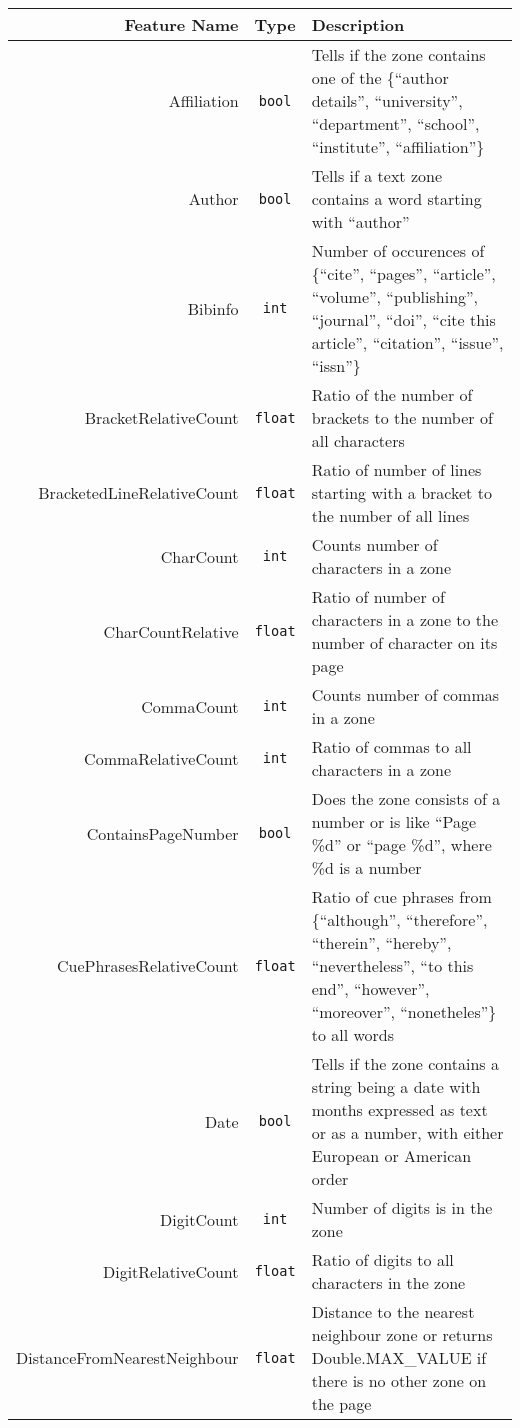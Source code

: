 \begin{appendices}
\small
\setlength\LTleft{-2cm}
\begin{longtable}[c]{|r|c|p{8cm}|}
\hline
\textbf{Feature Name} & \textbf{Type} & \textbf{Description} \\ \hline
Affiliation & \verb+bool+ & Tells if the zone contains one of the \{``author details'', ``university'', ``department'', ``school'', ``institute'', ``affiliation''\}\\ \hline
Author & \verb+bool+ & Tells if a text zone contains a word starting with ``author''\\ \hline
Bibinfo & \verb+int+ & Number of occurences of \{``cite'', ``pages'', ``article'', ``volume'', ``publishing'', ``journal'', ``doi'', ``cite this article'', ``citation'', ``issue'', ``issn''\} \\ \hline
BracketRelativeCount & \verb+float+ & Ratio of the number of brackets to the number of all characters \\ \hline
BracketedLineRelativeCount & \verb+float+ & Ratio of number of lines starting with a bracket to the number of all lines\\ \hline
CharCount & \verb+int+ & Counts number of characters in a zone\\ \hline
CharCountRelative & \verb+float+ & Ratio of number of characters in a zone to the number of character on its page\\ \hline
CommaCount & \verb+int+ & Counts number of commas in a zone\\ \hline
CommaRelativeCount & \verb+int+ & Ratio of commas to all characters in a zone \\ \hline
ContainsPageNumber & \verb+bool+  & Does the zone consists of a number or is like ``Page \%d'' or ``page \%d'', where \%d is a number \\ \hline
CuePhrasesRelativeCount & \verb+float+ & Ratio of cue phrases from \{``although'', ``therefore'', ``therein'', ``hereby'', ``nevertheless'', ``to this end'', ``however'', ``moreover'', ``nonetheles''\} to all words\\ \hline
Date & \verb+bool+ & Tells if the zone contains a string being a date with months expressed as text or as a number, with either European or American order\\ \hline
DigitCount & \verb+int+ & Number of digits is in the zone\\ \hline
DigitRelativeCount & \verb+float+ & Ratio of digits to all characters in the zone \\ \hline
DistanceFromNearestNeighbour & \verb+float+ & Distance to the nearest neighbour zone or returns Double.MAX\_VALUE if there is no other zone on the page\\ \hline

\end{longtable}
\end{appendices}
